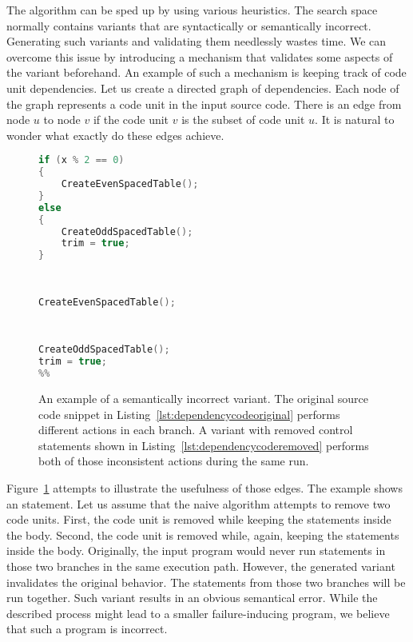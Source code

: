 The algorithm can be sped up by using various heuristics. 
The search space normally contains variants that are syntactically or 
semantically incorrect. 
Generating such variants and validating them needlessly wastes time. 
We can overcome this issue by introducing a mechanism that validates some 
aspects of the variant beforehand. 
An example of such a mechanism is keeping track of code unit dependencies. 
Let us create a directed graph of dependencies. 
Each node of the graph represents a code unit in the input source code. 
There is an edge from node $u$ to node $v$ if the code unit $v$ is 
the subset of code unit $u$. 
It is natural to wonder what exactly do these edges achieve. 

\begin{figure}[H]
\begin{minipage}{0.46\textwidth}
\begin{lstlisting}[basicstyle=\small, caption=An if - else statement.,
  language=C++, label={lst:dependencycodeoriginal}]
if (x % 2 == 0)
{
	CreateEvenSpacedTable();
}
else
{
	CreateOddSpacedTable();
	trim = true;
}
\end{lstlisting}
\end{minipage}
\hfill
\begin{minipage}{.45\textwidth}
\begin{lstlisting}[basicstyle=\small, caption=An invalid variant 
of~\ref{lst:dependencycodeoriginal}., language=C++, numbers=right,
  escapechar=\%, label={lst:dependencycoderemoved}]
	
	
CreateEvenSpacedTable();
	
	
	
CreateOddSpacedTable();
trim = true;
%%

\end{lstlisting}
\end{minipage}
\caption{An example of a semantically incorrect variant. The original source
code snippet in Listing~\ref{lst:dependencycodeoriginal} performs different 
actions in each branch. A variant with removed control statements shown in
Listing~\ref{lst:dependencycoderemoved} performs both of those inconsistent 
actions during the same run.}
\label{lst:dependencycode}
\end{figure}

Figure~\ref{lst:dependencycode} attempts to illustrate the usefulness 
of those edges. 
The example shows an  statement. 
Let us assume that the naive algorithm attempts to remove two code units. 
First, the code unit  is removed while keeping the statements 
inside the body. 
Second, the code unit  is removed while, again, keeping 
the statements inside the body. 
Originally, the input program would never run statements in those two 
branches in the same execution path. 
However, the generated variant invalidates the original behavior. 
The statements from those two branches will be run together. 
Such variant results in an obvious semantical error. 
While the described process might lead to a smaller failure-inducing program, 
we believe that such a program is incorrect. 

